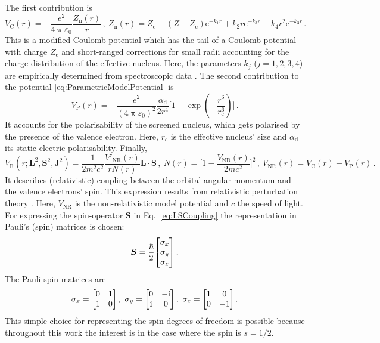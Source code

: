 \documentclass[fontsize=12pt,
               twoside=false,
               BCOR=0mm,
               DIV=14,
               overfullrule=false, %
               toc=bibliography,
               headinclude=true,
               footinclude=false]{scrartcl}
\numberwithin{equation}{section}
\newcommand{\ee}{\mathrm{e}}
\newcommand{\ii}{\mathrm{i}}
\newcommand{\pii}{\uppi}
\begin{document}
    The first contribution is
    \begin{equation}
        V_\mathrm{C}(r)
        =
        -\frac{e^2}{4\pii\varepsilon_0}\frac{Z_\mathrm{n}(r)}{r}
    \,, \
        Z_\mathrm{n}(r)
        =
        Z_\mathrm{c}+(Z-Z_\mathrm{c})\ee^{-k_1r}
        +
        k_2r\ee^{-k_3r}
        -
        k_4r^2\ee^{-k_3r}
    \,.
    \end{equation}
    This is a modified Coulomb potential which has the tail of a Coulomb
    potential with charge $Z_\mathrm{c}$ and short-ranged corrections for small
    radii accounting for the charge-distribution of the effective nucleus.
    Here, the parameters $k_j$ ($j=1,2,3,4$) are empirically determined from
    spectroscopic data \cite{aymar1996,marinescu1994}. The second contribution
    to the potential \eqref{eq:ParametricModelPotential} is
    \begin{equation}
        V_\mathrm{P}(r)
        =
        -\frac{e^2}{(4\pii\varepsilon_0)^2}
        \frac{\alpha_\mathrm{d}}{2r^4}
        \bigg[1-\exp(-\frac{r^6}{r^6_\mathrm{c}})\bigg]
    \,.
    \end{equation}
    It accounts for the polarisability of the screened nucleus, which gets
    polarised by the presence of the valence electron. Here, $r_\mathrm{c}$ is
    the effective nucleus' size and $\alpha_\mathrm{d}$ its static electric
    polarisability. Finally,
    \begin{equation}\label{eq:LSCoupling}
        V_\mathrm{R}(r;\bm{L}^2,\bm{S}^2,\bm{J}^2)
        =
        \frac{1}{2m^2c^2}\frac{V'_\mathrm{NR}(r)}{rN(r)}\bm{L}\cdot\bm{S}
    \,, \
        N(r) = \bigg[ 1 - \frac{V_\mathrm{NR}(r)}{2mc^2} \bigg]^2
    \,, \
        V_\mathrm{NR}(r) = V_\mathrm{C}(r) + V_\mathrm{P}(r)
    \,.
    \end{equation}
    It describes (relativistic) coupling between the orbital angular momentum
    and the valence electrons' spin. This expression results from relativistic
    perturbation theory \cite{condon1951}. Here, $V_\mathrm{NR}$ is the
    non-relativistic model potential and $c$ the speed of light. For expressing
    the spin-operator $\bm{S}$ in Eq.~\eqref{eq:LSCoupling} the representation
    in Pauli's (spin) matrices is chosen:
    \begin{equation}
        \bm{S} = \frac{\hbar}{2}\mqty[\sigma_x \\ \sigma_y \\ \sigma_z]
    \,.
    \end{equation}
    The Pauli spin matrices are
    \begin{equation}
        \sigma_x = \mqty[0&1 \\ 1&0]
    \,, \
        \sigma_y = \mqty[0&-\ii \\ \ii&0]
    \,, \
        \sigma_z = \mqty[1&0 \\ 0&-1]
    \,.
    \end{equation}
    This simple choice for representing the spin degrees of freedom is possible
    because throughout this work the interest is in the case where the spin is
    $s=1\slash{2}$.
\end{document}
